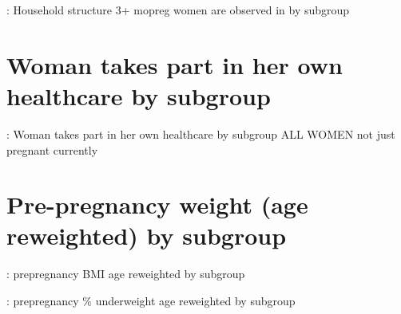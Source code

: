 \documentclass{article}
\begin{document}
\begin{table}[H]
    \centering
    \setlength{\tabcolsep}{4pt} %
    \footnotesize %
    \caption{: Household structure 3+ mopreg women are observed in by subgroup}
    \label{tab:sumstat}
    \begin{adjustbox}{width=\textwidth}
        
    \end{adjustbox}
\end{table}



\section{Woman takes part in her own healthcare by subgroup}

\begin{table}[H]
    \centering
    
    \setlength{\tabcolsep}{4pt} %
    \footnotesize %
    \caption{: Woman takes part in her own healthcare by subgroup ALL WOMEN not just pregnant currently}
    \label{tab:sumstat}
    \begin{adjustbox}{width=\textwidth}
        
    \end{adjustbox}
\end{table}

\section{Pre-pregnancy weight (age reweighted) by subgroup}

\begin{table}[H]
    \centering
    \setlength{\tabcolsep}{4pt} %
    \footnotesize %
    \caption{: prepregnancy BMI age reweighted by subgroup}
    \label{tab:sumstat}
    \begin{adjustbox}{width=\textwidth}
        
    \end{adjustbox}
\end{table}

\begin{table}[H]
    \centering
    \setlength{\tabcolsep}{4pt} %
    \footnotesize %
    \caption{: prepregnancy \% underweight age reweighted by subgroup}
    \label{tab:sumstat}
    \begin{adjustbox}{width=\textwidth}
        
    \end{adjustbox}
\end{table}
\end{document}
